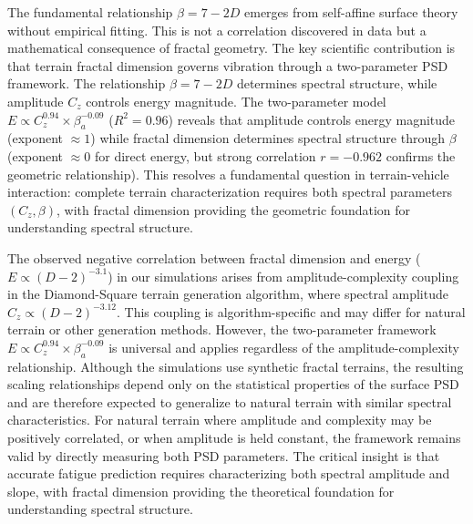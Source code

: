 \documentclass[11pt]{article}
\begin{document}
The fundamental relationship $\beta = 7-2D$ emerges from self-affine surface theory without empirical fitting\cite{Mandelbrot1982,Turcotte1997}. This is not a correlation discovered in data but a mathematical consequence of fractal geometry. The key scientific contribution is that terrain fractal dimension governs vibration through a two-parameter PSD framework. The relationship $\beta = 7-2D$ determines spectral structure, while amplitude $C_z$ controls energy magnitude. The two-parameter model $E \propto C_z^{0.94} \times \beta_a^{-0.09}$ ($R^2 = 0.96$) reveals that amplitude controls energy magnitude (exponent $\approx 1$) while fractal dimension determines spectral structure through $\beta$ (exponent $\approx 0$ for direct energy, but strong correlation $r=-0.962$ confirms the geometric relationship). This resolves a fundamental question in terrain-vehicle interaction: complete terrain characterization requires both spectral parameters $(C_z, \beta)$, with fractal dimension providing the geometric foundation for understanding spectral structure.

The observed negative correlation between fractal dimension and energy ($E \propto (D-2)^{-3.1}$) in our simulations arises from amplitude-complexity coupling in the Diamond-Square terrain generation algorithm, where spectral amplitude $C_z \propto (D-2)^{-3.12}$. This coupling is algorithm-specific and may differ for natural terrain or other generation methods. However, the two-parameter framework $E \propto C_z^{0.94} \times \beta_a^{-0.09}$ is universal and applies regardless of the amplitude-complexity relationship. Although the simulations use synthetic fractal terrains, the resulting scaling relationships depend only on the statistical properties of the surface PSD and are therefore expected to generalize to natural terrain with similar spectral characteristics. For natural terrain where amplitude and complexity may be positively correlated, or when amplitude is held constant, the framework remains valid by directly measuring both PSD parameters. The critical insight is that accurate fatigue prediction requires characterizing both spectral amplitude and slope, with fractal dimension providing the theoretical foundation for understanding spectral structure.
\end{document}
